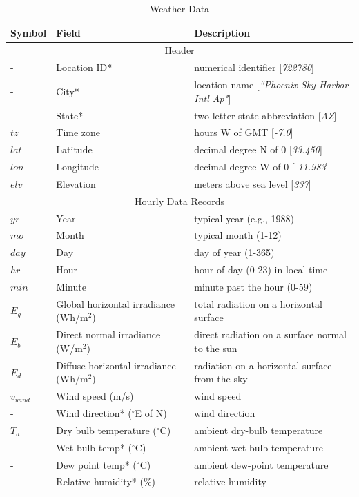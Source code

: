 \documentclass[12pt,letterpaper]{article}
\begin{document}
\begin{table}
\begin{center}
\caption{Weather Data}
\begin{tabular}{lll}
\midrule
Symbol & Field & Description\\
\midrule
\multicolumn{3}{c}{Header}\\
- & Location ID* & numerical identifier [\textit{722780}]\\
 - & City* & location name [\textit{``Phoenix Sky Harbor Intl Ap"}]\\
- & State* & two-letter state abbreviation [\textit{AZ}]\\
$\mathit{tz}$ &Time zone & hours W of GMT [\textit{-7.0}] \\
$\mathit{lat}$ & Latitude & decimal degree N of 0 [\textit{33.450}] \\
$\mathit{lon}$ & Longitude & decimal degree W of 0 [\textit{-11.983}]\\
$\mathit{elv}$ & Elevation & meters above sea level [\textit{337}]\\
\midrule
\multicolumn{3}{c}{Hourly Data Records}\\
$\mathit{yr}$& Year & typical year (e.g., 1988) \\
$\mathit{mo}$ & Month & typical month (1-12) \\
$\mathit{day}$ & Day & day of year (1-365) \\
$\mathit{hr}$ & Hour & hour of day (0-23) in local time \\
$\mathit{min}$ & Minute & minute past the hour (0-59) \\
$E_g$ & Global horizontal irradiance (Wh/m$^2$) & total radiation on a horizontal surface \\
$E_b$ & Direct normal irradiance (W/m$^2$) & direct radiation on a surface normal to the sun \\
$E_d$ & Diffuse horizontal irradiance (Wh/m$^2$) & radiation on a horizontal surface from the sky \\
$v_{wind}$ & Wind speed (m/s) & wind speed \\
-  & Wind direction* ($^{\circ}$E of N) & wind direction \\
$T_a$ & Dry bulb temperature ($^{\circ}$C) & ambient dry-bulb temperature \\
- & Wet bulb temp* ($^{\circ}$C) & ambient wet-bulb temperature \\
- & Dew point temp* ($^{\circ}$C) & ambient dew-point temperature \\
- & Relative humidity* (\%) &  relative humidity \\

\end{tabular}
\end{center}
\end{table}
\end{document}
